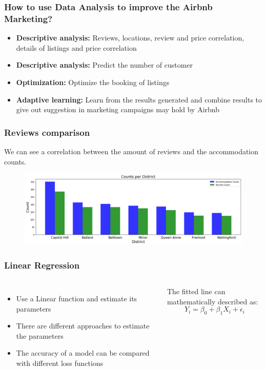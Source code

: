 \documentclass{beamer}
\begin{document}

\begin{frame}
\frametitle{How to use Data Analysis to improve the Airbnb Marketing?}
\begin{itemize}
\item \textbf{Descriptive analysis:} Reviews, locations, review and price correlation, details of listings and price correlation
\item \textbf{Descriptive analysis:} Predict the number of customer
\item \textbf{Optimization:} Optimize the booking of listings 
\item \textbf{Adaptive learning:} Learn from the results generated and combine results to give out suggestion in marketing campaigns may hold by Airbnb
\end{itemize}
\end{frame}


\begin{frame}
	\frametitle{Reviews comparison}
	We can see a correlation between the amount of reviews and the accommodation counts. 
	\begin{figure}
		\includegraphics[width=0.8\linewidth]{photo/3_count_per_district}
	\end{figure}
\end{frame}


\begin{frame}
	\frametitle{Linear Regression}
	\begin{columns}[c] %
		
		\begin{itemize}
			\item Use a Linear function and estimate its parameters
			\item There are different approaches to estimate the parameters
			\item The accuracy of a model can be compared with different loss functions
		\end{itemize}
		
		The fitted line can mathematically described as:
		\begin{equation}
		Y_i = \beta_0 + \beta_1 X_i + \epsilon_i
		\end{equation}
		
	\end{columns}
\end{frame}
\end{document}
